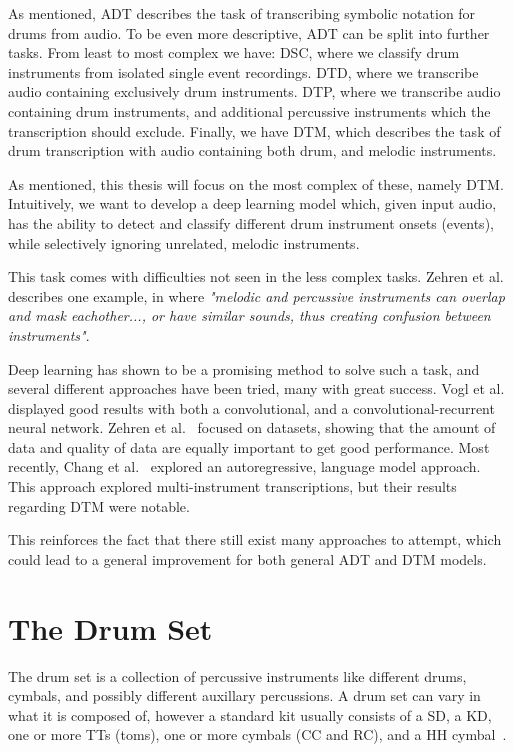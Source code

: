 As mentioned, \gls{ADT} describes the task of transcribing symbolic notation for drums from audio. To be even more descriptive, \gls{ADT} can be split into further tasks. From least to most complex we have: \gls{DSC}, where we classify drum instruments from isolated single event recordings. \gls{DTD}, where we transcribe audio containing exclusively drum instruments. \gls{DTP}, where we transcribe audio containing drum instruments, and additional percussive instruments which the transcription should exclude. Finally, we have \gls{DTM}, which describes the task of drum transcription with audio containing both drum, and melodic instruments.~\cite{8350302}

As mentioned, this thesis will focus on the most complex of these, namely \gls{DTM}. Intuitively, we want to develop a deep learning model which, given input audio, has the ability to detect and classify different drum instrument onsets (events), while selectively ignoring unrelated, melodic instruments.

This task comes with difficulties not seen in the less complex tasks. Zehren et al.~\cite{signals4040042} describes one example, in where \textit{"melodic and percussive instruments can overlap and mask eachother..., or have similar sounds, thus creating confusion between instruments"}.

Deep learning has shown to be a promising method to solve such a task, and several different approaches have been tried, many with great success. Vogl et al.~\cite{vogl2018multiinstrumentdrumtranscription, Vogl2017DrumTV} displayed good results with both a convolutional, and a convolutional-recurrent neural network. Zehren et al.~\cite{signals4040042, zehren2024analyzingreducingsynthetictorealtransfer} focused on datasets, showing that the amount of data and quality of data are equally important to get good performance. Most recently, Chang et al.~\cite{chang2024yourmt3+} explored an autoregressive, language model approach. This approach explored multi-instrument transcriptions, but their results regarding \gls{DTM} were notable.

This reinforces the fact that there still exist many approaches to attempt, which could lead to a general improvement for both general \gls{ADT} and \gls{DTM} models.

\section{The Drum Set}

The drum set is a collection of percussive instruments like different drums, cymbals, and possibly different auxillary percussions. A drum set can vary in what it is composed of, however a standard kit usually consists of a \gls{SD}, a \gls{KD}, one or more \glspl{TT} (toms), one or more cymbals (\gls{CC} and \gls{RC}), and a \gls{HH} cymbal~\cite{TheDrumHandbook2003}.

